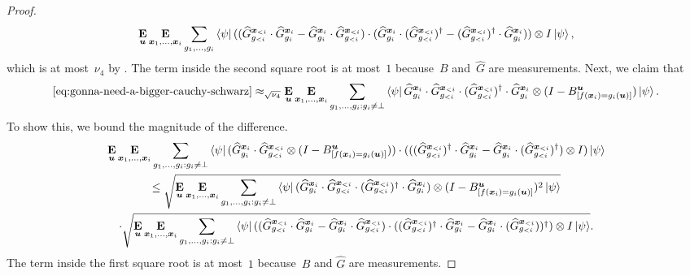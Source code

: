 \begin{proof}
\begin{equation}
\mathop{\bf E\/}_{\boldsymbol{u}}  \mathop{\bf E\/}_{{\boldsymbol{x}}_1, \dots, {\boldsymbol{x}}_i} \sum_{g_1, \dots, g_i}   \bra{\psi}
  ((\widehat{G}^{{\boldsymbol{x}}_{<i}}_{g_{<i}}  \cdot \widehat{G}^{{\boldsymbol{x}}_i}_{g_i} - \widehat{G}^{{\boldsymbol{x}}_i}_{g_i}  \cdot \widehat{G}^{{\boldsymbol{x}}_{<i}}_{g_{<i}})  \cdot  (\widehat{G}^{{\boldsymbol{x}}_i}_{g_i}\cdot (\widehat{G}^{{\boldsymbol{x}}_{<i}}_{g_{<i}})^\dagger - (\widehat{G}^{{\boldsymbol{x}}_{<i}}_{g_{<i}})^\dagger \cdot \widehat{G}^{{\boldsymbol{x}}_i}_{g_i})) \otimes I \ket{\psi},
\end{equation}
which is at most~$\nu_4$ by .
The term inside the second square root is at most~$1$ because~$B$ and~$\widehat{G}$ are measurements.
Next, we claim that
\begin{equation}\label{eq:even-bigger-CS}
\eqref{eq:gonna-need-a-bigger-cauchy-schwarz}
\approx_{\sqrt{\nu_4}}
\mathop{\bf E\/}_{\boldsymbol{u}}  \mathop{\bf E\/}_{{\boldsymbol{x}}_1, \dots, {\boldsymbol{x}}_i} \sum_{g_1, \dots, g_i: g_i \neq \bot} \bra{\psi}\widehat{G}^{{\boldsymbol{x}}_i}_{g_i} \cdot
  \widehat{G}^{{\boldsymbol{x}}_{<i}}_{g_{<i}}  \cdot (\widehat{G}^{{\boldsymbol{x}}_{<i}}_{g_{<i}} )^\dagger \cdot  \widehat{G}^{{\boldsymbol{x}}_i}_{g_i}\otimes (I - B^{\boldsymbol{u}}_{[f({\boldsymbol{x}}_i) =
    g_i(\boldsymbol{u})]}) \ket{\psi}.
\end{equation}
To show this, we bound the magnitude of the difference.
\begin{multline*}
\mathop{\bf E\/}_{\boldsymbol{u}}  \mathop{\bf E\/}_{{\boldsymbol{x}}_1, \dots, {\boldsymbol{x}}_i} \sum_{g_1, \dots, g_i: g_i \neq \bot}  \bra{\psi}
   (\widehat{G}^{{\boldsymbol{x}}_i}_{g_i} \cdot \widehat{G}^{{\boldsymbol{x}}_{<i}}_{g_{<i}} \otimes (I - B^{\boldsymbol{u}}_{[f({\boldsymbol{x}}_i) =
    g_i(\boldsymbol{u})]})) \cdot (((\widehat{G}^{{\boldsymbol{x}}_{<i}}_{g_{<i}})^\dagger  \cdot \widehat{G}^{{\boldsymbol{x}}_i}_{g_i} - \widehat{G}^{{\boldsymbol{x}}_i}_{g_i}  \cdot (\widehat{G}^{{\boldsymbol{x}}_{<i}}_{g_{<i}})^\dagger) \otimes I) \ket{\psi}\\
    \leq 
    \sqrt{\mathop{\bf E\/}_{\boldsymbol{u}}  \mathop{\bf E\/}_{{\boldsymbol{x}}_1, \dots, {\boldsymbol{x}}_i} \sum_{g_1, \dots, g_i: g_i \neq \bot}  \bra{\psi}
  (\widehat{G}^{{\boldsymbol{x}}_i}_{g_i} \cdot\widehat{G}^{{\boldsymbol{x}}_{<i}}_{g_{<i}}  \cdot  (\widehat{G}^{{\boldsymbol{x}}_{<i}}_{g_{<i}} )^\dagger \cdot \widehat{G}^{{\boldsymbol{x}}_i}_{g_i}) \otimes (I - B^{\boldsymbol{u}}_{[f({\boldsymbol{x}}_i) =
    g_i(\boldsymbol{u})]})^2 \ket{\psi}}\\
    \cdot
    \sqrt{\mathop{\bf E\/}_{\boldsymbol{u}}  \mathop{\bf E\/}_{{\boldsymbol{x}}_1, \dots, {\boldsymbol{x}}_i} \sum_{g_1, \dots, g_i: g_i \neq \bot}   \bra{\psi}
  ((\widehat{G}^{{\boldsymbol{x}}_{<i}}_{g_{<i}}  \cdot \widehat{G}^{{\boldsymbol{x}}_i}_{g_i} - \widehat{G}^{{\boldsymbol{x}}_i}_{g_i}  \cdot \widehat{G}^{{\boldsymbol{x}}_{<i}}_{g_{<i}})  \cdot  ((\widehat{G}^{{\boldsymbol{x}}_{<i}}_{g_{<i}})^\dagger  \cdot \widehat{G}^{{\boldsymbol{x}}_i}_{g_i} - \widehat{G}^{{\boldsymbol{x}}_i}_{g_i}  \cdot (\widehat{G}^{{\boldsymbol{x}}_{<i}}_{g_{<i}}))^\dagger) \otimes I \ket{\psi}}.
\end{multline*}
The term inside the first square root is at most~$1$ because~$B$ and $\widehat{G}$ are measurements.

\end{proof}
